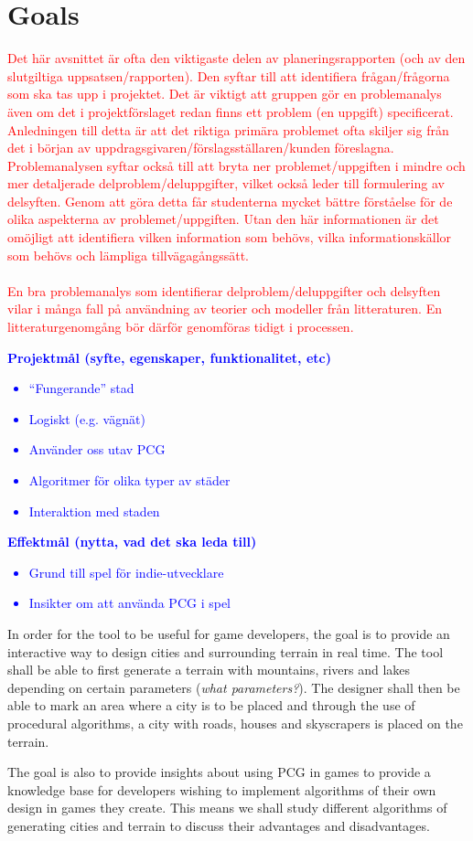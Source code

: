 \section{Goals}
\textcolor{red}{
Det här avsnittet är ofta den viktigaste delen av planeringsrapporten (och av den slutgiltiga uppsatsen/rapporten). Den syftar till att identifiera frågan/frågorna som ska tas upp i projektet. Det är viktigt att gruppen gör en problemanalys även om det i projektförslaget redan finns ett problem (en uppgift) specificerat. Anledningen till detta är att det riktiga primära problemet ofta skiljer sig från det i början av uppdragsgivaren/förslagsställaren/kunden föreslagna. Problemanalysen syftar också till att bryta ner problemet/uppgiften i mindre och mer detaljerade delproblem/deluppgifter, vilket också leder till formulering av delsyften. Genom att göra detta får studenterna mycket bättre förståelse för de olika aspekterna av problemet/uppgiften. Utan den här informationen är det omöjligt att identifiera vilken information som behövs, vilka informationskällor som behövs och lämpliga tillvägagångssätt.
\\\\
En bra problemanalys som identifierar delproblem/deluppgifter och delsyften vilar i många fall på användning av teorier och modeller från litteraturen. En litteraturgenomgång bör därför genomföras tidigt i processen.
}

\textcolor{blue}{
\textbf{Projektmål (syfte, egenskaper, funktionalitet, etc)}
\begin{itemize}
    \item “Fungerande” stad
    \item Logiskt (e.g. vägnät)
    \item Använder oss utav PCG
    \item Algoritmer för olika typer av städer
    \item Interaktion med staden
\end{itemize}
\textbf{Effektmål (nytta, vad det ska leda till)}
\begin{itemize}
    \item Grund till spel för indie-utvecklare
    \item Insikter om att använda PCG i spel
\end{itemize}
}

In order for the tool to be useful for game developers, the goal is to provide an interactive way to design cities and surrounding terrain in real time. The tool shall be able to first generate a terrain with mountains, rivers and lakes depending on certain parameters (\textit{what parameters?}). The designer shall then be able to mark an area where a city is to be placed and through the use of procedural algorithms, a city with roads, houses and skyscrapers is placed on the terrain. 

The goal is also to provide insights about using PCG in games to provide a knowledge base for developers wishing to implement algorithms of their own design in games they create. This means we shall study different algorithms of generating cities and terrain to discuss their advantages and disadvantages.



